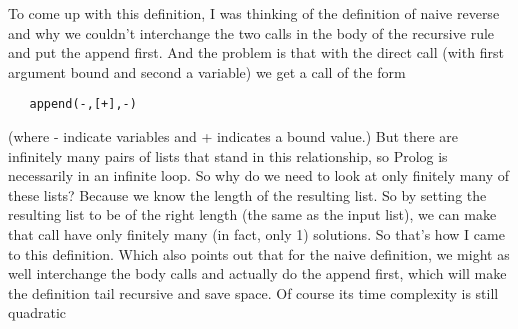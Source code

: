 To come up with this definition, I was thinking of the definition of
naive reverse and why we couldn't interchange the two calls in the
body of the recursive rule and put the append first.  And the problem
is that with the direct call (with first argument bound and second a
variable) we get a call of the form
\begin{verbatim}
   append(-,[+],-)
\end{verbatim}
(where - indicate variables and + indicates a bound value.)  But there
are infinitely many pairs of lists that stand in this relationship, so
Prolog is necessarily in an infinite loop.  So why do we need to look
at only finitely many of these lists?  Because we know the length of
the resulting list.  So by setting the resulting list to be of the
right length (the same as the input list), we can make that call have
only finitely many (in fact, only 1) solutions.  So that's how I came
to this definition.  Which also points out that for the naive
definition, we might as well interchange the body calls and actually
do the append first, which will make the definition tail recursive and
save space.  Of course its time complexity is still quadratic
